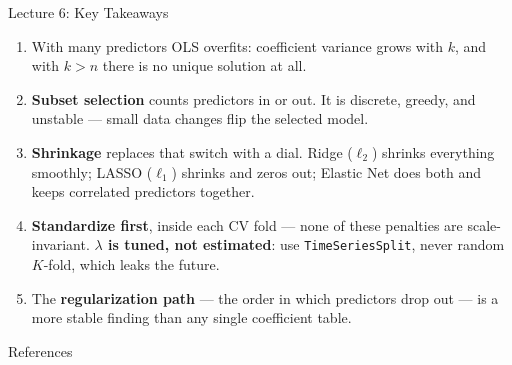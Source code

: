 \documentclass[aspectratio=169, 11pt]{beamer}
\begin{document}
\begin{frame}{Lecture 6: Key Takeaways}
  \begin{keybox}
    {\footnotesize
    \begin{enumerate}\itemsep1pt
      \item With many predictors OLS overfits: coefficient variance grows with
            $k$, and with $k > n$ there is no unique solution at all.

      \item \textbf{Subset selection} counts predictors in or out. It is discrete,
            greedy, and unstable --- small data changes flip the selected model.

      \item \textbf{Shrinkage} replaces that switch with a dial. Ridge ($\ell_2$)
            shrinks everything smoothly; LASSO ($\ell_1$) shrinks and zeros out;
            Elastic Net does both and keeps correlated predictors together.

      \item \textbf{Standardize first}, inside each CV fold --- none of these
            penalties are scale-invariant. \textbf{$\lambda$ is tuned, not
            estimated}: use \texttt{TimeSeriesSplit}, never random $K$-fold,
            which leaks the future.

      \item The \textbf{regularization path} --- the order in which predictors
            drop out --- is a more stable finding than any single coefficient table.
    \end{enumerate}
    }
  \end{keybox}
\end{frame}

\begin{frame}[allowframebreaks]{References}
  \printbibliography[heading=none]
\end{frame}

\end{document}
